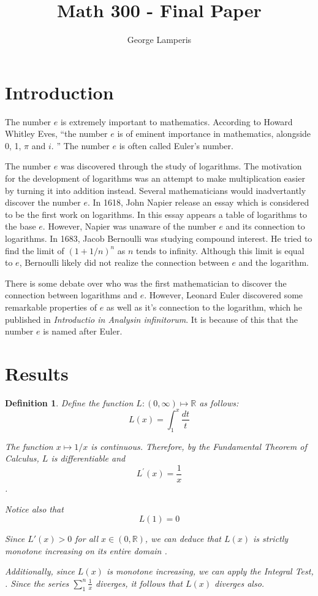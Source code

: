 \documentclass[12pt]{article}
\title{Math 300 - Final Paper}
\author{George Lamperis}
\date{}
\theoremstyle{mystyle}
\newtheorem{defn}[thm]{Definition}
\newcommand{\R}{\mathbb{R}}
\begin{document}
\maketitle

\section{Introduction}
The number $e$ is extremely important to mathematics. According to Howard
Whitley Eves, ``the number $e$ is of eminent importance in mathematics,
alongside 0, 1, $\pi$ and $i$. \cite{wikipedia} '' The number $e$ is often
called Euler's number.

The number $e$ was discovered through the study of logarithms. The motivation
for the development of logarithms was an attempt to make multiplication easier
by turning it into addition instead. Several mathematicians would inadvertantly
discover the number $e$. In 1618, John Napier release an essay which is
considered to be the first work on logarithms. In this essay appears a table of 
logarithms to the base $e$. However, Napier was unaware of the number $e$
and its connection to logarithms. In 1683, Jacob Bernoulli was studying compound interest. 
He tried to find the limit of $(1 + 1/n)^n$ as $n$ tends to infinity. Although
this limit is equal to $e$, Bernoulli likely did not realize the connection
between $e$ and the logarithm. \cite{USAS}

There is some debate over who was the first mathematician to discover the
connection between logarithms and $e$. However, Leonard Euler discovered some
remarkable properties of $e$ as well as it's connection to the logarithm, which
he published in \textit{Introductio in Analysin infinitorum}. It is because of
this that the number $e$ is named after Euler.


\section{Results}

\begin{defn}
  Define the function $L: (0, \infty) \mapsto \R$ as follows:
  $$ L(x) = \int_1^x \frac{dt}{t} $$
  
  The function $x \mapsto 1/x$ is continuous. Therefore, by the Fundamental
  Theorem of Calculus, $L$ is differentiable and
  $$ L^\prime(x) = \frac{1}{x} $$.
  
  Notice also that
  $$L(1) = 0$$
  
  Since $L'(x) > 0$ for all $x \in (0, \R)$,  we can deduce that $L(x)$ is
  strictly monotone increasing on its entire domain \cite[Theorem 4.13]{howie}.
  
  Additionally, since $L(x)$ is monotone increasing, we can apply the Integral
  Test, \cite[Theorem 5.37]{howie}. Since the series $\sum_1^n \frac{1}{x}$
  diverges, it follows that $L(x)$ diverges also.
\end{defn}
\end{document}
